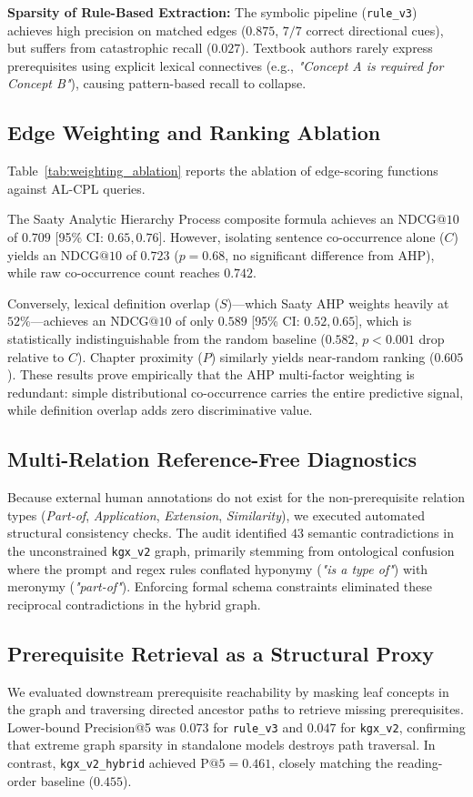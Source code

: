 \textbf{Sparsity of Rule-Based Extraction:} The symbolic pipeline (\texttt{rule\_v3}) achieves high precision on matched edges ($0.875$, $7/7$ correct directional cues), but suffers from catastrophic recall ($0.027$). Textbook authors rarely express prerequisites using explicit lexical connectives (e.g., \textit{"Concept A is required for Concept B"}), causing pattern-based recall to collapse.

\subsection{Edge Weighting and Ranking Ablation}
Table~\ref{tab:weighting_ablation} reports the ablation of edge-scoring functions against AL-CPL queries.



The Saaty Analytic Hierarchy Process composite formula achieves an $\text{NDCG@10}$ of $0.709$ [95\% CI: $0.65, 0.76$]. However, isolating sentence co-occurrence alone ($C$) yields an $\text{NDCG@10}$ of $0.723$ ($p = 0.68$, no significant difference from AHP), while raw co-occurrence count reaches $0.742$. 

Conversely, lexical definition overlap ($S$)—which Saaty AHP weights heavily at $52\%$—achieves an $\text{NDCG@10}$ of only $0.589$ [95\% CI: $0.52, 0.65$], which is statistically indistinguishable from the random baseline ($0.582$, $p < 0.001$ drop relative to $C$). Chapter proximity ($P$) similarly yields near-random ranking ($0.605$). These results prove empirically that the AHP multi-factor weighting is redundant: simple distributional co-occurrence carries the entire predictive signal, while definition overlap adds zero discriminative value.

\subsection{Multi-Relation Reference-Free Diagnostics}
Because external human annotations do not exist for the non-prerequisite relation types (\textit{Part-of}, \textit{Application}, \textit{Extension}, \textit{Similarity}), we executed automated structural consistency checks. The audit identified $43$ semantic contradictions in the unconstrained \texttt{kgx\_v2} graph, primarily stemming from ontological confusion where the prompt and regex rules conflated hyponymy (\textit{"is a type of"}) with meronymy (\textit{"part-of"}). Enforcing formal schema constraints eliminated these reciprocal contradictions in the hybrid graph.

\subsection{Prerequisite Retrieval as a Structural Proxy}
We evaluated downstream prerequisite reachability by masking leaf concepts in the graph and traversing directed ancestor paths to retrieve missing prerequisites. Lower-bound Precision@5 was $0.073$ for \texttt{rule\_v3} and $0.047$ for \texttt{kgx\_v2}, confirming that extreme graph sparsity in standalone models destroys path traversal. In contrast, \texttt{kgx\_v2\_hybrid} achieved $\text{P@5} = 0.461$, closely matching the reading-order baseline ($0.455$).
